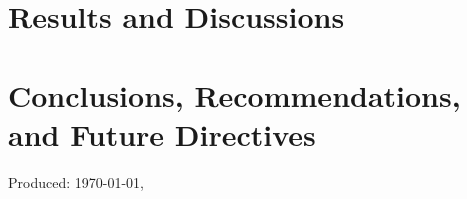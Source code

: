 	\ifResultDiscuss 
	\chapter{Results and Discussions} 
		
	\cleardoublepage
	\fi
	
	\ifConc
	\chapter{Conclusions, Recommendations, and Future Directives} 
	\label{ch:conc} 
		
	\cleardoublepage
	\fi
	
	\renewcommand{\UrlFont}{\normalfont}
	\begin{SingleSpace}
		{\small }
		\vfill
		
			
			
		
		
	\end{SingleSpace}
	\vfill
	\begin{flushright}
		Produced: \usdate\today, \currenttime \\
	\end{flushright}
	\cleardoublepage 
	
